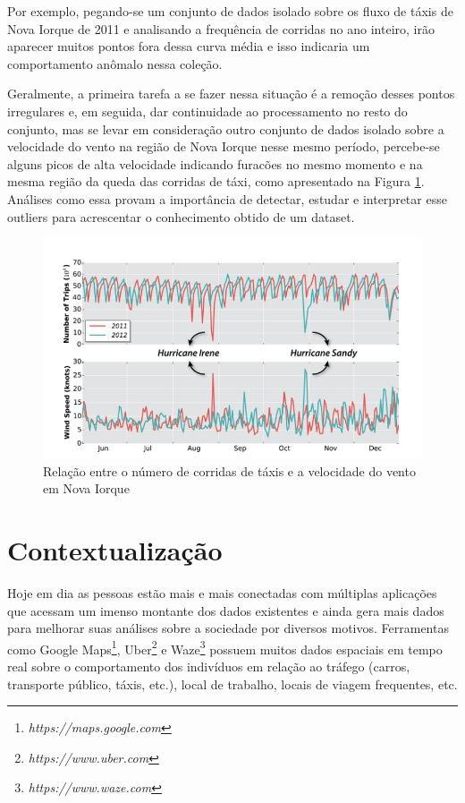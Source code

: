 Por exemplo, pegando-se um conjunto de dados isolado sobre os fluxo de táxis de Nova Iorque de 2011 e analisando a frequência de corridas no ano inteiro, irão aparecer muitos pontos fora dessa curva média e isso indicaria um comportamento anômalo nessa coleção.

Geralmente, a primeira tarefa a se fazer nessa situação é a remoção desses pontos irregulares e, em seguida, dar continuidade ao processamento no resto do conjunto, mas se levar em consideração outro conjunto de dados isolado sobre a velocidade do vento na região de Nova Iorque nesse mesmo período, percebe-se alguns picos de alta velocidade indicando furacões no mesmo momento e na mesma região da queda das corridas de táxi, como apresentado na Figura \ref{fig:freire-paper-taxi-wind}. Análises como essa provam a importância de detectar, estudar e interpretar esse outliers para acrescentar o conhecimento obtido de um dataset.

\begin{figure}[t]
	\centering
	\includegraphics[width=\textwidth]{images/outlier-freire-figure-1}
	\caption{Relação entre o número de corridas de táxis e a velocidade do vento em Nova Iorque \cite{DBLP:journals/debu/FreireCVZ16}}
	\label{fig:freire-paper-taxi-wind}
	\vspace{-10pt}
\end{figure}

\section{Contextualização}

Hoje em dia as pessoas estão mais e mais conectadas com múltiplas aplicações que acessam um imenso montante dos dados existentes e ainda gera mais dados para melhorar suas análises sobre a sociedade por diversos motivos. Ferramentas como Google Maps\footnote{\it https://maps.google.com}, Uber\footnote{\it https://www.uber.com} e Waze\footnote{\it https://www.waze.com} possuem muitos dados espaciais em tempo real sobre o comportamento dos indivíduos em relação ao tráfego (carros, transporte público, táxis, etc.), local de trabalho, locais de viagem frequentes, etc.

